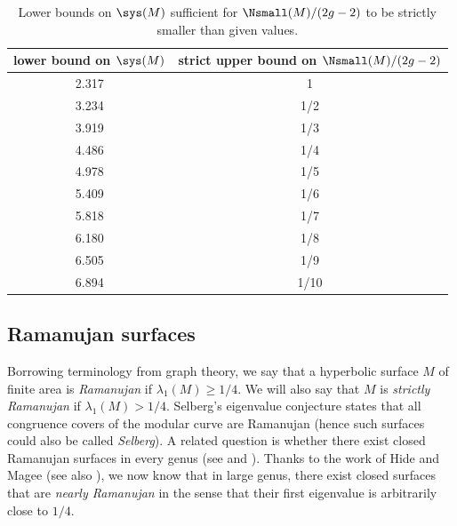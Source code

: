 \documentclass[12pt]{amsart}
\numberwithin{equation}{section}
\begin{document}
{\footnotesize
\begin{table}[htp] 
\centering
\caption{Lower bounds on $\sys(M)$ sufficient for $\Nsmall(M)/(2g-2)$ to be strictly smaller than given values.} \label{table:nsmall}
\begin{tabular}{|c|c|}
\hline
lower bound on $\sys(M)$ & strict upper bound on $\Nsmall(M)/(2g-2)$  \\
\hline
2.317 & 1   \\ 
3.234 & 1/2 \\ 
3.919 & 1/3  \\ 
4.486 & 1/4  \\
4.978 & 1/5  \\
5.409 & 1/6  \\
5.818 & 1/7  \\
6.180 & 1/8  \\
6.505 & 1/9  \\
6.894 & 1/10  \\
\hline
\end{tabular}
\end{table}
}

\subsection{Ramanujan surfaces}  \label{subsec:gaps}

Borrowing terminology from graph theory, we say that a hyperbolic surface $M$ of finite area is \emph{Ramanujan} if $\lambda_1(M) \geq 1/4$. We will also say that $M$ is \emph{strictly Ramanujan} if $\lambda_1(M) > 1/4$. Selberg's eigenvalue conjecture \cite{Selberg} states that all congruence covers of the modular curve are Ramanujan (hence such surfaces could also be called \emph{Selberg}). A related question is whether there exist closed Ramanujan surfaces in every genus (see \cite[Question 1.1]{Mondal} and \cite[Problem 10.4]{Wright}).  Thanks to the work of Hide and Magee \cite{HideMagee} (see also \cite{AnantharamanMonk2,polynomial_rate,MageePudervanHandel}), we now know that in large genus, there exist closed surfaces that are \emph{nearly Ramanujan} in the sense that their first eigenvalue is arbitrarily close to $1/4$.
\end{document}
